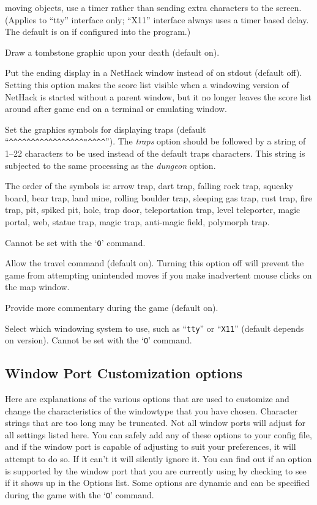 moving objects, use a timer rather than sending extra characters to the
screen.  (Applies to ``tty'' interface only; ``X11'' interface always
uses a timer based delay.  The default is on if configured into the
program.)
\item[\ib{tombstone}]
Draw a tombstone graphic upon your death (default on).
\item[\ib{toptenwin}]
Put the ending display in a NetHack window instead of on stdout (default off).
Setting this option makes the score list visible when a windowing version
of NetHack is started without a parent window, but it no longer leaves
the score list around after game end on a terminal or emulating window.
\item[\ib{traps}]
Set the graphics symbols for displaying traps (default
``\verb&^^^^^^^^^^^^^^^^^"^^^^&'').
The {\it traps\/} option should be followed by a string of 1--22
characters to be used instead of the default traps characters.
This string is subjected to the same processing as the {\it dungeon\/} option.

The order of the symbols is:
arrow trap, dart trap, falling rock trap, squeaky board, bear trap,
land mine, rolling boulder trap, sleeping gas trap, rust trap, fire trap,
pit, spiked pit, hole, trap door, teleportation trap, level teleporter,
magic portal, web, statue trap, magic trap, anti-magic field, polymorph trap.

Cannot be set with the `{\tt O}' command.
\item[\ib{travel}]
Allow the travel command (default on).  Turning this option off will
prevent the game from attempting unintended moves if you make inadvertent
mouse clicks on the map window.
\item[\ib{verbose}]
Provide more commentary during the game (default on).
\item[\ib{windowtype}]
Select which windowing system to use, such as ``{\tt tty}'' or ``{\tt X11}''
(default depends on version).
Cannot be set with the `{\tt O}' command.
\elist

\subsection*{Window Port Customization options}

Here are explanations of the various options that are
used to customize and change the characteristics of the
windowtype that you have chosen.
Character strings that are too long may be truncated.
Not all window ports will adjust for all settings listed
here.  You can safely add any of these options to your 
config file, and if the window port is capable of adjusting 
to suit your preferences, it will attempt to do so. If it
can't it will silently ignore it.  You can find out if an 
option is supported by the window port that you are currently
using by checking to see if it shows up in the Options list.
Some options are dynamic and can be specified during the game
with the `{\tt O}' command.

